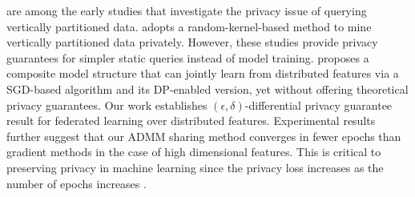 \cite{vaidya2002privacy,dwork2004privacy} are among the early studies that investigate the privacy issue of querying vertically partitioned data. \cite{kenthapadi2013privacy} adopts a random-kernel-based method to mine vertically partitioned data privately. 
However, these studies provide privacy guarantees for simpler static queries instead of model training. 
\cite{hu2019fdml} proposes a composite model structure that can jointly learn from distributed features via a SGD-based algorithm and its DP-enabled version, yet without offering theoretical privacy guarantees. Our work establishes $(\epsilon,\delta)$-differential privacy guarantee result for federated learning over distributed features. Experimental results further suggest that our ADMM sharing method converges in fewer epochs than gradient methods in the case of high dimensional features. 
This is critical to preserving privacy in machine learning since the privacy loss increases as the number of epochs increases \cite{dwork2014algorithmic}. 







